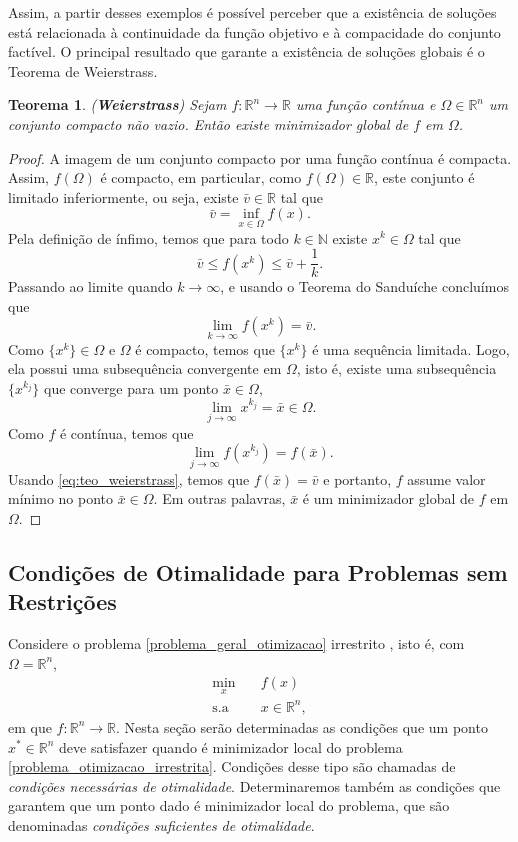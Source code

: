 \documentclass[12pt,a4paper]{scrartcl}
\def\RR{\mathds{R}}
\newtheorem{teo}{Teorema}
\theoremstyle{definition}%
\begin{document}
Assim, a partir desses exemplos é possível perceber que a existência de soluções está relacionada à continuidade da função objetivo e à compacidade do conjunto factível. O principal resultado que garante a existência de soluções globais é o Teorema de Weierstrass.

\begin{teo}(\textbf{Weierstrass}) \label{teo:weierstrass}
Sejam $f: \RR^{n} \rightarrow \RR$ uma função contínua e $\Omega \in \RR^{n}$ um conjunto compacto não vazio. Então existe minimizador global de $f$ em $\Omega$.
\end{teo}
\begin{proof}
A imagem de um conjunto compacto por uma função contínua é compacta. Assim, $f(\Omega)$ é compacto, em particular, como $f(\Omega) \in \RR$, este conjunto é limitado inferiormente, ou seja, existe $\bar{v} \in \RR$ tal que
\[
\bar{v} = \inf_{x\in \Omega} f(x).
\]
Pela definição de ínfimo, temos que para todo $k\in \mathds{N}$ existe $x^{k} \in \Omega$ tal que 
\[
\bar{v} \leq f(x^{k}) \leq \bar{v} + \dfrac{1}{k} .
\]
Passando ao limite quando $k \rightarrow \infty $, e usando o Teorema do Sanduíche concluímos que
\[\label{eq:teo_weierstrass}
\displaystyle\lim_{k \rightarrow \infty} f(x^{k}) = \bar{v}.
\]
Como $\{ x^{k} \} \in \Omega$ e $\Omega$ é compacto, temos que $\{ x^{k} \}$ é uma sequência limitada. Logo, ela possui uma subsequência convergente em $\Omega$, isto é, existe uma subsequência $\{ x^{k_{j}} \}$ que converge para um ponto $\bar{x} \in \Omega$,
\[
\displaystyle\lim_{j \rightarrow \infty} x^{k_{j}} = \bar{x} \in \Omega .
\]
Como $f$ é contínua, temos que
\[
\displaystyle\lim_{j \rightarrow \infty} f(x^{k_{j}}) = f(\bar{x}).
\]
Usando \eqref{eq:teo_weierstrass}, temos que $f(\bar{x}) = \bar{v}$ e portanto, $f$ assume valor mínimo no ponto $\bar{x} \in \Omega$. Em outras palavras, $\bar{x}$ é um minimizador global de $f$ em $\Omega$.
\end{proof}


\subsection{Condições de Otimalidade para Problemas sem Restrições} \label{subsection:irrestrito}

Considere o problema \eqref{problema_geral_otimizacao} irrestrito , isto é, com $\Omega = \RR^{n}$,
\[ \label{problema_otimizacao_irrestrita}
\begin{aligned}
\min_{x} & \quad f(x) \\
\text{s.a} & \quad x \in \RR^{n} ,
\end{aligned}
\]
em que $f:\RR^{n} \rightarrow \RR$. Nesta seção serão determinadas as condições que um ponto $x^{*} \in \RR^{n}$ deve satisfazer quando é minimizador local do problema \eqref{problema_otimizacao_irrestrita}. Condições desse tipo são chamadas de \emph{condições necessárias de otimalidade}. Determinaremos também as condições que garantem que um ponto dado é minimizador local do problema, que são denominadas \emph{condições suficientes de otimalidade}. 
\end{document}
